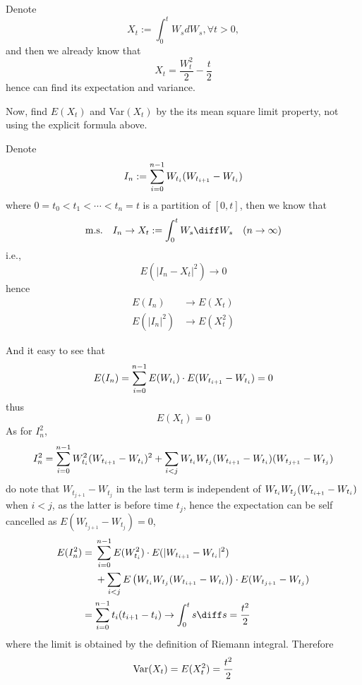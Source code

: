     \problem
    \begin{question}
        Denote
        \[X_t:=\int_0^t W_sdW_s, \forall t>0,\]
        and then we already know that
        \[X_t=\frac{W_t^2}{2}-\frac{t}{2}\]
        hence can find its expectation and variance.

        Now, find $E(X_t)$ and Var$(X_t)$ by the its mean square limit property,
        not using the explicit formula above.
    \end{question}
    \label{var and e}
    \newcommand{\wj}{W_{t_j}}
    \newcommand{\wjj}{W_{t_{j+1}}}
    \newcommand{\deltawj}{\wjj-\wj}
    Denote
    \[I_n:=\sum_{i=0}^{n-1}W_{t_i}(W_{t_{i+1}}-W_{t_i})\]
    where $0=t_0<t_1<\cdots<t_n=t$ is a partition of $[0,t]$,
    then we know that
    \[\text{m.s.}\quad I_n\to X_t:=\int_0^tW_s\diff W_s
    \quad(n\to\infty)\]
    i.e.,
    \[E(|I_n-X_t|^2)\to 0\]
    hence
    \[\begin{aligned}
        E(I_n)&\to E(X_t)\\
        E(|I_n|^2)&\to E(X_t^2)
    \end{aligned}\]

    And it easy to see that
    \[E(I_n)=\sum_{i=0}^{n-1} E(W_{t_i})\cdot E(W_{t_{i+1}}-W_{t_i})=0\]
    thus
    \[E(X_t)=0\]
    As for $I_n^2$,
    \[I_n^2=\sumhead\wi^2(\deltaw)^2
    +\sum_{i<j}\wi\wj(\deltaw)(\deltawj)\]
    do note that $\deltawj$ in the last term is independent
    of $\wi\wj(\deltaw)$ when $i<j$, as the latter is before
    time $t_j$, hence the expectation can be self cancelled
    as $E(\deltawj)=0$,
    \[\begin{aligned}
        E(I_n^2)
        &=\begin{aligned}[t]
         &\sumhead E(\wi^2)\cdot E(|\deltaw|^2)\\
         &+\sum_{i<j}E\left(\wi\wj(\deltaw)\right)\cdot E(\deltawj)
         \end{aligned}\\
        &=\sumhead t_i(t_{i+1}-t_i)
        \to\int_0^ts\diff s=\frac{t^2}{2}
    \end{aligned}\]
    where the limit is obtained by the definition of Riemann integral.
    Therefore
    \[\mathrm{Var}(X_t)=E(X_t^2)=\frac{t^2}{2}\]

